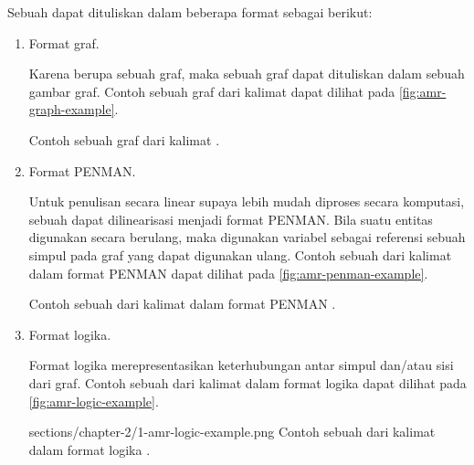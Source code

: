 Sebuah \AMR{} dapat dituliskan dalam beberapa format sebagai berikut:
\begin{enumerate}
  \item Format graf.

  Karena \AMR{} berupa sebuah graf, maka sebuah graf \AMR{} dapat dituliskan dalam sebuah gambar graf.
  Contoh sebuah graf \AMR{} dari kalimat  dapat dilihat pada \cref{fig:amr-graph-example}.

    {Contoh sebuah graf \AMR{} dari kalimat  .}

  \item Format PENMAN.

  Untuk penulisan secara linear supaya lebih mudah diproses secara komputasi, sebuah \AMR{} dapat dilinearisasi menjadi format PENMAN.
  Bila suatu entitas digunakan secara berulang, maka digunakan variabel sebagai referensi sebuah simpul pada graf yang dapat digunakan ulang.
  Contoh sebuah \AMR{} dari kalimat  dalam format PENMAN dapat dilihat pada \cref{fig:amr-penman-example}.

    {Contoh sebuah \AMR{} dari kalimat  dalam format PENMAN .}

  \item Format logika.

  Format logika merepresentasikan keterhubungan antar simpul dan/atau sisi dari graf.
  Contoh sebuah \AMR{} dari kalimat  dalam format logika dapat dilihat pada \cref{fig:amr-logic-example}.

    {sections/chapter-2/1-amr-logic-example.png}
    {Contoh sebuah \AMR{} dari kalimat  dalam format logika .}
\end{enumerate}
